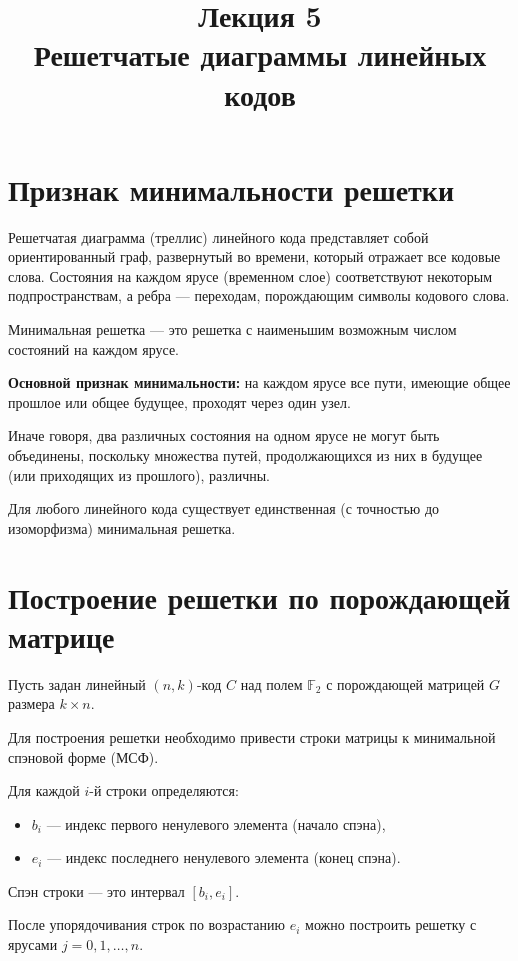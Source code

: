\documentclass[a4paper,12pt]{article}
\title{Лекция 5 \\ Решетчатые диаграммы линейных кодов}
\author{}
\date{}
\begin{document}
\maketitle

\section{Признак минимальности решетки}

Решетчатая диаграмма (треллис) линейного кода представляет собой ориентированный граф,
развернутый во времени, который отражает все кодовые слова. Состояния на каждом ярусе
(временном слое) соответствуют некоторым подпространствам, а ребра --- переходам,
порождающим символы кодового слова.

Минимальная решетка --- это решетка с наименьшим возможным числом состояний на каждом ярусе.

\textbf{Основной признак минимальности:} на каждом ярусе все пути, имеющие общее прошлое
или общее будущее, проходят через один узел.

Иначе говоря, два различных состояния на одном ярусе не могут быть объединены, поскольку
множества путей, продолжающихся из них в будущее (или приходящих из прошлого), различны.

Для любого линейного кода существует единственная (с точностью до изоморфизма)
минимальная решетка.

\section{Построение решетки по порождающей матрице}

Пусть задан линейный $(n,k)$-код $C$ над полем $\mathbb{F}_2$ с порождающей матрицей
$G$ размера $k \times n$.

Для построения решетки необходимо привести строки матрицы к минимальной спэновой форме (МСФ).

Для каждой $i$-й строки определяются:
\begin{itemize}
    \item $b_i$ --- индекс первого ненулевого элемента (начало спэна),
    \item $e_i$ --- индекс последнего ненулевого элемента (конец спэна).
\end{itemize}

Спэн строки --- это интервал $[b_i, e_i]$.

После упорядочивания строк по возрастанию $e_i$ можно построить решетку с ярусами
$j = 0,1,\dots,n$.
\end{document}
